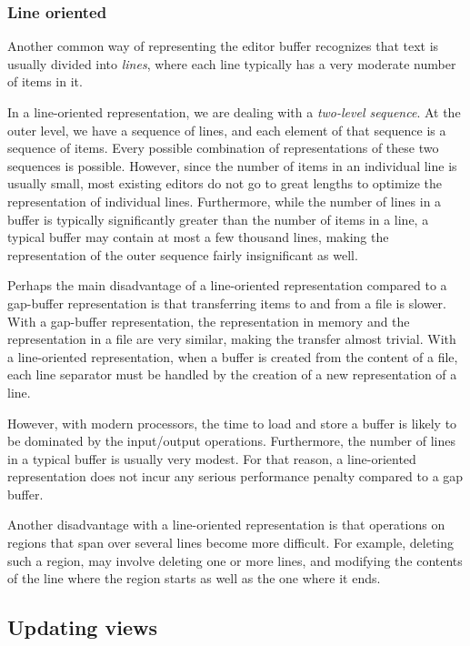 \subsubsection{Line oriented}
\label{sec-previous-line-oriented}

Another common way of representing the editor buffer recognizes that
text is usually divided into \emph{lines}, where each line typically
has a very moderate number of items in it.

In a line-oriented representation, we are dealing with a
\emph{two-level sequence}.  At the outer level, we have a sequence of
lines, and each element of that sequence is a sequence of items.
Every possible combination of representations of these two sequences
is possible.  However, since the number of items in an individual line
is usually small, most existing editors do not go to great lengths to
optimize the representation of individual lines.  Furthermore, while
the number of lines in a buffer is typically significantly greater
than the number of items in a line, a typical buffer may contain at
most a few thousand lines, making the representation of the outer
sequence fairly insignificant as well.

Perhaps the main disadvantage of a line-oriented representation
compared to a gap-buffer representation is that transferring items to
and from a file is slower.  With a gap-buffer representation, the
representation in memory and the representation in a file are very
similar, making the transfer almost trivial.  With a line-oriented
representation, when a buffer is created from the content of a file,
each line separator must be handled by the creation of a new
representation of a line.

However, with modern processors, the time to load and store a buffer
is likely to be dominated by the input/output operations.
Furthermore, the number of lines in a typical buffer is usually very
modest.  For that reason, a line-oriented representation does not
incur any serious performance penalty compared to a gap buffer.

Another disadvantage with a line-oriented representation is that
operations on regions that span over several lines become more
difficult.  For example, deleting such a region, may involve deleting
one or more lines, and modifying the contents of the line where the
region starts as well as the one where it ends.

\subsection{Updating views}


